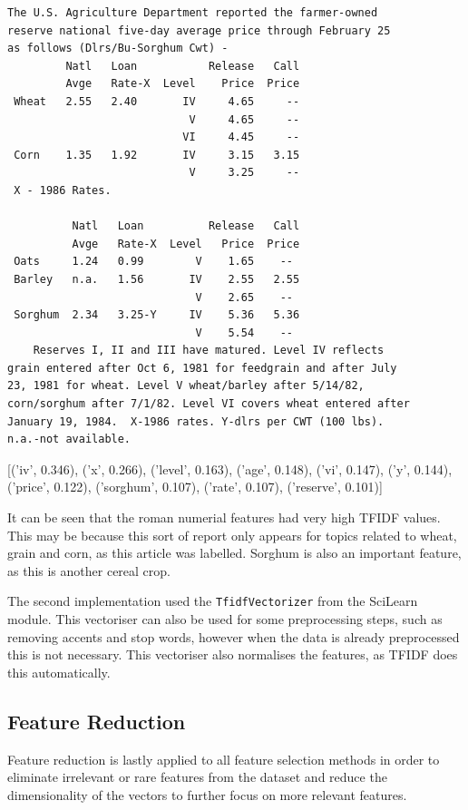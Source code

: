 \documentclass{article}
\begin{document}
\begin{verbatim}
The U.S. Agriculture Department reported the farmer-owned
reserve national five-day average price through February 25
as follows (Dlrs/Bu-Sorghum Cwt) -
         Natl   Loan           Release   Call
         Avge   Rate-X  Level    Price  Price
 Wheat   2.55   2.40       IV     4.65     --
                            V     4.65     --
                           VI     4.45     --
 Corn    1.35   1.92       IV     3.15   3.15
                            V     3.25     --
 X - 1986 Rates.

          Natl   Loan          Release   Call
          Avge   Rate-X  Level   Price  Price
 Oats     1.24   0.99        V    1.65    -- 
 Barley   n.a.   1.56       IV    2.55   2.55
                             V    2.65    -- 
 Sorghum  2.34   3.25-Y     IV    5.36   5.36
                             V    5.54    -- 
    Reserves I, II and III have matured. Level IV reflects
grain entered after Oct 6, 1981 for feedgrain and after July
23, 1981 for wheat. Level V wheat/barley after 5/14/82,
corn/sorghum after 7/1/82. Level VI covers wheat entered after
January 19, 1984.  X-1986 rates. Y-dlrs per CWT (100 lbs).
n.a.-not available.
\end{verbatim}

[('iv', 0.346), ('x', 0.266), ('level', 0.163), ('age', 0.148), ('vi', 0.147), ('y', 0.144), ('price', 0.122), ('sorghum', 0.107), ('rate', 0.107), ('reserve', 0.101)]

It can be seen that the roman numerial features had very high TFIDF values. This may be because this sort of report only appears for topics related to wheat, grain and corn, as this article was labelled. Sorghum is also an important feature, as this is another cereal crop.

The second implementation used the \verb|TfidfVectorizer| from the SciLearn module. This vectoriser can also be used for some preprocessing steps, such as removing accents and stop words, however when the data is already preprocessed this is not necessary. This vectoriser also normalises the features, as TFIDF does this automatically.

\subsection{Feature Reduction}
Feature reduction is lastly applied to all feature selection methods in order to eliminate irrelevant or rare features from the dataset and reduce the dimensionality of the vectors to further focus on more relevant features.
\end{document}
